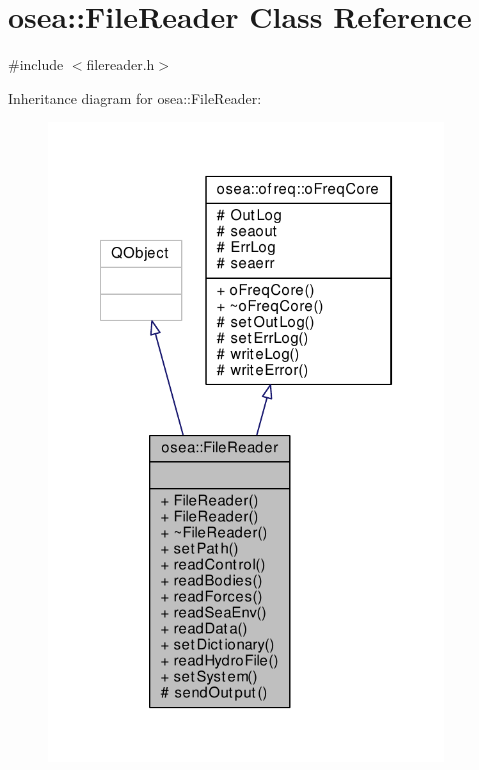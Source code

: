 \hypertarget{classosea_1_1_file_reader}{\section{osea\-:\-:File\-Reader Class Reference}
\label{classosea_1_1_file_reader}
}


{\ttfamily \#include $<$filereader.\-h$>$}



Inheritance diagram for osea\-:\-:File\-Reader\-:
\nopagebreak
\begin{figure}[H]
\begin{center}
\leavevmode
\includegraphics[width=297pt]{classosea_1_1_file_reader__inherit__graph}
\end{center}
\end{figure}
